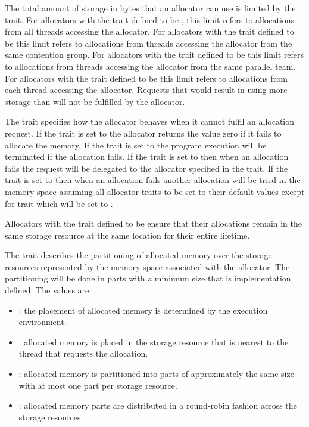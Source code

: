 The total amount of storage in bytes that an allocator can use is limited by 
the {} trait. For allocators with the  trait 
defined to be , this limit refers to allocations from all threads 
accessing the allocator. For allocators with the  trait defined 
to be  this limit refers to allocations from threads accessing 
the allocator from the same contention group. For allocators with the 
 trait defined to be  this limit refers to 
allocations from threads accessing the allocator from the same parallel 
team. For allocators with the  trait defined to be  
this limit refers to allocations from each thread accessing the allocator. 
Requests that would result in using more storage than {} 
will not be fulfilled by the allocator.

The  trait specifies how the allocator behaves when it 
cannot fulfil an allocation request. If the  trait is set 
to  the allocator returns the value zero if it fails to 
allocate the memory. If the  trait is set to  
the program execution will be terminated if the allocation fails. If the 
 trait is set to  then when an allocation 
fails the request will be delegated to the allocator specified in the 
 trait. If the  trait is set to 
 then when an allocation fails another allocation 
will be tried in the  memory space assuming 
all allocator traits to be set to their default values except for 
 trait which will be set to .

Allocators with the  trait defined to be  
ensure that their allocations remain in the same storage resource at 
the same location for their entire lifetime.

The {} trait describes the partitioning of allocated
memory over the storage resources represented by the memory space associated
with the allocator. The partitioning will be done in parts with a minimum size
that is implementation defined. The values are:

\begin{itemize}
\item {}: the placement of allocated memory is determined 
      by the execution environment.
\item {}: allocated memory is placed in the storage resource 
      that is nearest to the thread that requests the allocation.
\item {}: allocated memory is partitioned into parts of 
      approximately the same size with at most one part per storage resource.
\item {}: allocated memory parts are distributed in a 
      round-robin fashion across the storage resources.
\end{itemize}

